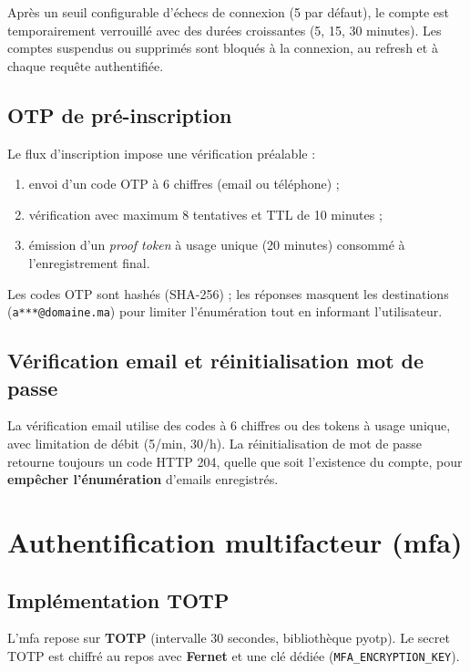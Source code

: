 Après un seuil configurable d'échecs de connexion (5 par défaut), le compte est temporairement verrouillé avec des durées croissantes (5, 15, 30 minutes). Les comptes suspendus ou supprimés sont bloqués à la connexion, au refresh et à chaque requête authentifiée.

\subsection{OTP de pré-inscription}

Le flux d'inscription impose une vérification préalable :
\begin{enumerate}
  \item envoi d'un code OTP à 6 chiffres (email ou téléphone) ;
  \item vérification avec maximum 8 tentatives et TTL de 10 minutes ;
  \item émission d'un \emph{proof token} à usage unique (20 minutes) consommé à l'enregistrement final.
\end{enumerate}

Les codes OTP sont hashés (SHA-256) ; les réponses masquent les destinations (\texttt{a***@domaine.ma}) pour limiter l'énumération tout en informant l'utilisateur.

\subsection{Vérification email et réinitialisation mot de passe}

La vérification email utilise des codes à 6 chiffres ou des tokens à usage unique, avec limitation de débit (5/min, 30/h). La réinitialisation de mot de passe retourne toujours un code HTTP 204, quelle que soit l'existence du compte, pour \textbf{empêcher l'énumération} d'emails enregistrés.

\section{Authentification multifacteur (\gls{mfa})}

\subsection{Implémentation TOTP}

L'\gls{mfa} repose sur \textbf{TOTP} (intervalle 30 secondes, bibliothèque pyotp). Le secret TOTP est chiffré au repos avec \textbf{Fernet} et une clé dédiée (\texttt{MFA\_ENCRYPTION\_KEY}).

